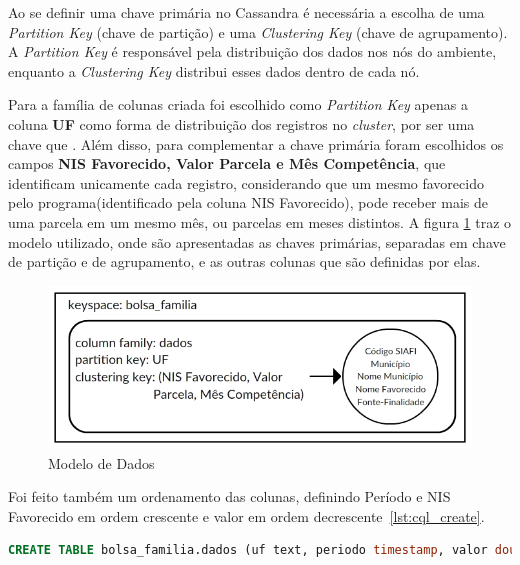 Ao se definir uma chave primária no Cassandra é necessária a escolha de uma \emph{Partition Key} (chave de partição) e uma \emph{Clustering Key} (chave de agrupamento). A \emph{Partition Key} é responsável pela distribuição dos dados nos nós do ambiente, enquanto a \emph{Clustering Key} distribui esses dados dentro de cada nó.

Para a família de colunas criada foi escolhido como \emph{Partition Key} apenas a coluna \textbf{UF} como forma de distribuição dos registros no \emph{cluster}, por ser uma chave que . Além disso, para complementar a chave primária foram escolhidos os campos \textbf{NIS Favorecido, Valor Parcela e Mês Competência}, que identificam unicamente cada registro, considerando que um mesmo favorecido pelo programa(identificado pela coluna NIS Favorecido), pode receber mais de uma parcela em um mesmo mês, ou parcelas em meses distintos. A figura \ref{fig:modelocassandra} traz o modelo utilizado, onde são apresentadas as chaves primárias, separadas em chave de partição e de agrupamento, e as outras colunas que são definidas por elas.

\begin{figure}[!htb]
	\centering
	\includegraphics[width=1\textwidth]{figuras/modelocassandra.png}
	\caption{Modelo de Dados}
	\label{fig:modelocassandra}
\end{figure}

Foi feito também um ordenamento das colunas, definindo Período e NIS Favorecido em ordem crescente e valor em ordem decrescente~\ref{lst:cql_create}. 

\begin{lstlisting}[caption={Código CQL criação da tabela},label={lst:cql_create},language=SQL]
CREATE TABLE bolsa_familia.dados (uf text, periodo timestamp, valor double, nis_favorecido bigint, cod_municipio int, fonte text, nome_favorecido text, nome_municipio text, PRIMARY KEY(uf, periodo, valor, nis_favorecido)) WITH CLUSTERING ORDER BY(periodo ASC, valor DESC, nis_favorecido ASC);
\end{lstlisting}

